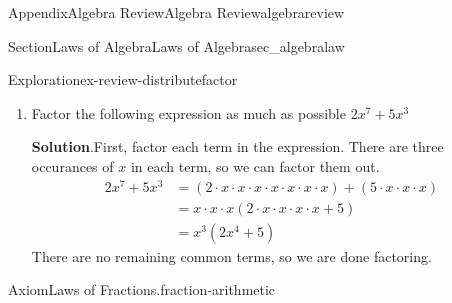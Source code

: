 \documentclass[oneside,10pt,]{tufte-book}
\newcommand{\blocktitlefont}{\relax}
\numberwithin{equation}{chapter}
\newcommand{\amp}{&}
\begin{document}
\begin{appendixptx}{Appendix}{Algebra Review}{}{Algebra Review}{}{}{algebrareview}
\begin{sectionptx}{Section}{Laws of Algebra}{}{Laws of Algebra}{}{}{sec_algebralaw}
\begin{exploration}{Exploration}{}{ex-review-distributefactor}
\begin{enumerate}[font=\bfseries,label=(\alph*),ref=\alph*]
\noindent\textbf{\blocktitlefont Solution}.\hypertarget{ex-review-distributefactor-9-2}{}\quad{}We want to write \(x^2 + x - 6 \) as an expression of the form \((a x + b) (c x + d) \)%
\begin{equation*}
(a x + b) (c x + d)  = (ab)x^2 + (ad+cb)x + bd
\end{equation*}
We want to pick \(a,b,c,d\) to get the right hand side to equal \(x^2+x-6\). There are three terms to consider%
\begin{itemize}[label=\textbullet]
\item{}We need \((ab)x^2=x^2\), so set \(a=b=1\). Plugging that into our factored form, we get%
\begin{equation*}
(x + b)(x+d) = x^2 + (d+b)x + bd 
\end{equation*}
%
\item{}We need the third term to be \(db=-6\).  Factoring gives \(db = (-1)\cdot 2\cdot 3\).  We must divide the factors \(-1\), \(2\), \(3\) between \(b,d\).%
\item{}To pick exact values for \(b,d\), recall that we need \(b+d=1\). Setting \(b=3\) and \(d=(-1)2\), we can confirm%
\begin{align*}
bd \amp = (3)(-1)(2) = -6\\
b+d \amp = 3 + (-1)(2) = 1
\end{align*}
as desired.%
\end{itemize}
Putting it together, we get%
\begin{align*}
x^2 + x - 6 \amp = (x+3)(x-2) 
\end{align*}
%
\item{}Factor the following expression as much as possible \(2x^7 + 5x^3 \)%
\par\smallskip%
\noindent\textbf{\blocktitlefont Solution}.\hypertarget{ex-review-distributefactor-10-2}{}\quad{}First, factor each term in the expression. There are three occurances of \(x\) in each term, so we can factor them out.%
\begin{align*}
2x^7 + 5x^3 \amp = (2\cdot x \cdot x\cdot x\cdot x\cdot x\cdot x\cdot x) + (5\cdot x\cdot x\cdot x) \\
\amp = x\cdot x\cdot x (2\cdot x\cdot x\cdot x\cdot x + 5)\\
\amp = x^3 (2 x^4 + 5)
\end{align*}
There are no remaining common terms, so we are done factoring.%
\end{enumerate}%
\end{exploration}%
\begin{axiom}{Axiom}{Laws of Fractions.}{}{fraction-arithmetic}%

\end{axiom}
\end{sectionptx}
\end{appendixptx}
\end{document}
